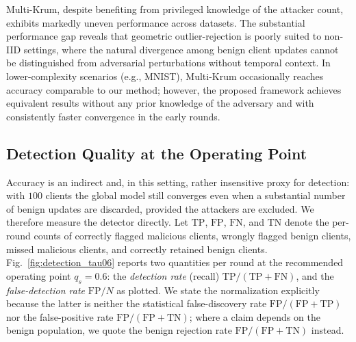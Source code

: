 \documentclass[journal]{IEEEtran}
\begin{document}
Multi-Krum, despite benefiting from privileged knowledge of the attacker count, exhibits markedly uneven performance across datasets. The substantial performance gap reveals that geometric outlier-rejection is poorly suited to non-IID settings, where the natural divergence among benign client updates cannot be distinguished from adversarial perturbations without temporal context. In lower-complexity scenarios (e.g., MNIST), Multi-Krum occasionally reaches accuracy comparable to our method; however, the proposed framework achieves equivalent results without any prior knowledge of the adversary and with consistently faster convergence in the early rounds.



\subsection{Detection Quality at the Operating Point}
\label{sec:detection_quality}

Accuracy is an indirect and, in this setting, rather insensitive proxy for detection: with $100$ clients the global model still converges even when a substantial number of benign updates are discarded, provided the attackers are excluded. We therefore measure the detector directly. Let $\mathrm{TP}$, $\mathrm{FP}$, $\mathrm{FN}$, and $\mathrm{TN}$ denote the per-round counts of correctly flagged malicious clients, wrongly flagged benign clients, missed malicious clients, and correctly retained benign clients. Fig.~\ref{fig:detection_tau06} reports two quantities per round at the recommended operating point $q_s = 0.6$: the \emph{detection rate} (recall) $\mathrm{TP}/(\mathrm{TP}+\mathrm{FN})$, and the \emph{false-detection rate} $\mathrm{FP}/N$ as plotted. We state the normalization explicitly because the latter is neither the statistical false-discovery rate $\mathrm{FP}/(\mathrm{FP}+\mathrm{TP})$ nor the false-positive rate $\mathrm{FP}/(\mathrm{FP}+\mathrm{TN})$; where a claim depends on the benign population, we quote the benign rejection rate $\mathrm{FP}/(\mathrm{FP}+\mathrm{TN})$ instead.
\end{document}
